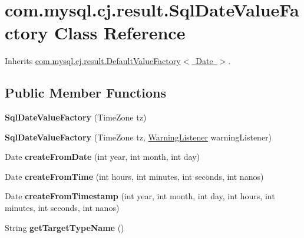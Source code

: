 \hypertarget{classcom_1_1mysql_1_1cj_1_1result_1_1_sql_date_value_factory}{}\section{com.\+mysql.\+cj.\+result.\+Sql\+Date\+Value\+Factory Class Reference}
\label{classcom_1_1mysql_1_1cj_1_1result_1_1_sql_date_value_factory}


Inherits \mbox{\hyperlink{classcom_1_1mysql_1_1cj_1_1result_1_1_default_value_factory}{com.\+mysql.\+cj.\+result.\+Default\+Value\+Factory$<$ Date $>$}}.

\subsection*{Public Member Functions}
\begin{DoxyCompactItemize}
\item 
\mbox{\label{classcom_1_1mysql_1_1cj_1_1result_1_1_sql_date_value_factory_afb89a4429b9fa7dd08b961e843940911}} 
{\bfseries Sql\+Date\+Value\+Factory} (Time\+Zone tz)
\item 
\mbox{\label{classcom_1_1mysql_1_1cj_1_1result_1_1_sql_date_value_factory_aa8e2b06921ed081d8c6f4b608783700c}} 
{\bfseries Sql\+Date\+Value\+Factory} (Time\+Zone tz, \mbox{\hyperlink{interfacecom_1_1mysql_1_1cj_1_1_warning_listener}{Warning\+Listener}} warning\+Listener)
\item 
\mbox{\label{classcom_1_1mysql_1_1cj_1_1result_1_1_sql_date_value_factory_a832addef031c4400a2a7bc8062436b50}} 
Date {\bfseries create\+From\+Date} (int year, int month, int day)
\item 
\mbox{\label{classcom_1_1mysql_1_1cj_1_1result_1_1_sql_date_value_factory_a8b7ca7f9ccedd1f69a380afb5e3505c7}} 
Date {\bfseries create\+From\+Time} (int hours, int minutes, int seconds, int nanos)
\item 
\mbox{\label{classcom_1_1mysql_1_1cj_1_1result_1_1_sql_date_value_factory_a2f9afd2aa491bdb58cc8ec47a83d8f08}} 
Date {\bfseries create\+From\+Timestamp} (int year, int month, int day, int hours, int minutes, int seconds, int nanos)
\item 
\mbox{\label{classcom_1_1mysql_1_1cj_1_1result_1_1_sql_date_value_factory_a30d4e2fdfddfca859625afbe4e56f2f4}} 
String {\bfseries get\+Target\+Type\+Name} ()
\end{DoxyCompactItemize}



